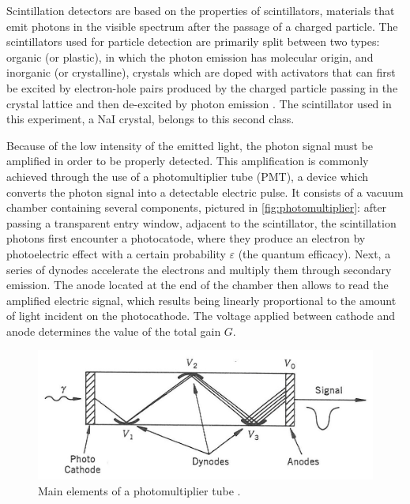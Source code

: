 Scintillation detectors are based on the properties of scintillators, materials that emit photons in the visible spectrum after the passage of a charged particle.
The scintillators used for particle detection are primarily split between two types: organic (or plastic), in which the photon emission has molecular origin, 
and inorganic (or crystalline), crystals which are doped with activators that can first be excited by electron-hole pairs 
produced by the charged particle passing in the crystal lattice  and then de-excited by photon emission \cite{intro_nuclear_particle_physics}.
The scintillator used in this experiment, a NaI crystal, belongs to this second class.

Because of the low intensity of the emitted light, the photon signal must be amplified in order to be properly detected.
This amplification is commonly achieved through the use of a photomultiplier tube (PMT), a device which converts the photon signal into a detectable electric pulse.
It consists of a vacuum chamber containing several components, pictured in \autoref{fig:photomultiplier}: 
after passing a transparent entry window, adjacent to the scintillator, 
the scintillation photons first encounter a photocatode, 
where they produce an electron by photoelectric effect with a certain 
probability $\varepsilon$ (the quantum efficacy).
Next, a series of dynodes accelerate the electrons and multiply 
them through secondary emission.
The anode located at the end of the chamber then allows to read 
the amplified electric signal, 
which results being linearly proportional to the amount of 
light incident on the photocathode.
The voltage applied between cathode and anode determines 
the value of the total gain $G$.
%
\begin{figure}[htbp]
    \centering
    \includegraphics[scale=1.2]{figures/photomultiplier.jpg}
    \caption{Main elements of a photomultiplier tube \cite{intro_nuclear_particle_physics}.}
    \label{fig:photomultiplier}
\end{figure}

